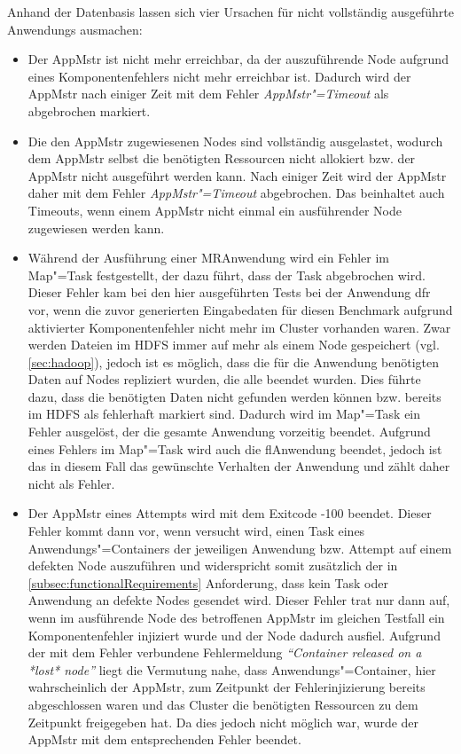 Anhand der Datenbasis lassen sich vier Ursachen für nicht vollständig ausgeführte \glspl{Anwendung} ausmachen:

\begin{itemize}
    \item
        Der \gls{AppMstr} ist nicht mehr erreichbar, da der auszuführende Node aufgrund eines Komponentenfehlers nicht mehr erreichbar ist.
        Dadurch wird der \gls{AppMstr} nach einiger Zeit mit dem Fehler \emph{\gls{AppMstr}"=Timeout} als abgebrochen markiert.
    \item
        Die den \gls{AppMstr} zugewiesenen Nodes sind vollständig ausgelastet, wodurch dem \gls{AppMstr} selbst die benötigten Ressourcen nicht allokiert bzw. der \gls{AppMstr} nicht ausgeführt werden kann.
        Nach einiger Zeit wird der \gls{AppMstr} daher mit dem Fehler \emph{\gls{AppMstr}"=Timeout} abgebrochen.
        Das beinhaltet auch Timeouts, wenn einem \gls{AppMstr} nicht einmal ein ausführender Node zugewiesen werden kann.
    \item
        Während der Ausführung einer \gls{MR}\gls{Anwendung} wird ein Fehler im Map"=Task festgestellt, der dazu führt, dass der Task abgebrochen wird.
        Dieser Fehler kam bei den hier ausgeführten \glspl{Test} bei der \gls{Anwendung} \acrlong{dfr} vor, wenn die zuvor generierten Eingabedaten für diesen Benchmark aufgrund aktivierter Komponentenfehler nicht mehr im Cluster vorhanden waren.
        Zwar werden Dateien im \gls{HDFS} immer auf mehr als einem Node gespeichert (vgl. \cref{sec:hadoop}), jedoch ist es möglich, dass die für die \gls{Anwendung} benötigten Daten auf Nodes repliziert wurden, die alle beendet wurden.
        Dies führte dazu, dass die benötigten Daten nicht gefunden werden können bzw. bereits im \gls{HDFS} als fehlerhaft markiert sind.
        Dadurch wird im Map"=Task ein Fehler ausgelöst, der die gesamte \gls{Anwendung} vorzeitig beendet.
        Aufgrund eines Fehlers im Map"=Task wird auch die \acrlong{fl}\gls{Anwendung} beendet, jedoch ist das in diesem Fall das gewünschte Verhalten der \gls{Anwendung} und zählt daher nicht als Fehler.
    \item
        Der \gls{AppMstr} eines \glspl{Attempt} wird mit dem Exitcode -100 beendet.
        Dieser Fehler kommt dann vor, wenn versucht wird, einen Task eines Anwendungs"=Containers der jeweiligen \gls{Anwendung} bzw. \gls{Attempt} auf einem defekten Node auszuführen und widerspricht somit zusätzlich der in \cref{subsec:functionalRequirements} Anforderung, dass kein Task oder \gls{Anwendung} an defekte Nodes gesendet wird.
        Dieser Fehler trat nur dann auf, wenn im ausführende Node des betroffenen \gls{AppMstr} im gleichen \gls{Testfall} ein Komponentenfehler injiziert wurde und der Node dadurch ausfiel.
        Aufgrund der mit dem Fehler verbundene Fehlermeldung \textit{\enquote{Container released on a *lost* node}} liegt die Vermutung nahe, dass Anwendungs"=Container, hier wahrscheinlich der \gls{AppMstr}, zum Zeitpunkt der Fehlerinjizierung bereits abgeschlossen waren und das Cluster die benötigten Ressourcen zu dem Zeitpunkt freigegeben hat.
        Da dies jedoch nicht möglich war, wurde der \gls{AppMstr} mit dem entsprechenden Fehler beendet.
\end{itemize}

